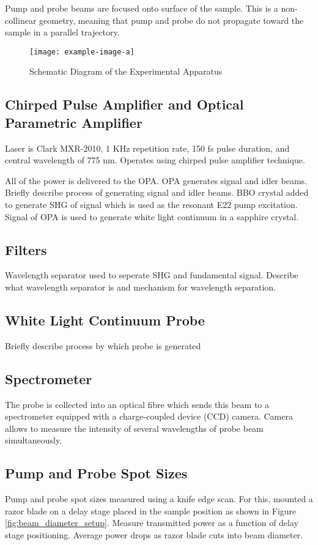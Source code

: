 Pump and probe beams are focused onto surface of the sample. This is a non-collinear geometry, meaning that pump and probe do not propagate toward the sample in a parallel trajectory. 

\begin{figure}[h]
	\centering
	\texttt{[image: example-image-a]}
	\caption{ Schematic Diagram of the Experimental Apparatus}
	\label{fig:sample_absorbance}
\end{figure}


\subsection{Chirped Pulse Amplifier and Optical Parametric Amplifier}
Laser is Clark MXR-2010, 1 KHz repetition rate, 150 fs pulse duration, and central wavelength of 775 nm. Operates using chirped pulse amplifier technique. 

All of the power is delivered to the OPA. OPA generates signal and idler beams. {\color{red} Briefly describe process of generating signal and idler beams}. BBO crystal added to generate SHG of signal which is used as the resonant E22 pump excitation. Signal of OPA is used to generate white light continuum in a sapphire crystal. 

\subsection{Filters}
 Wavelength separator used to seperate SHG and fundamental signal. {\color{red} Describe what wavelength separator is and mechanism for wavelength separation}.
 
\subsection{White Light Continuum Probe}

{\color{red} Briefly describe process by which probe is generated}

\subsection{Spectrometer}
The probe is collected into an optical fibre which sends this beam to a spectrometer equipped with a charge-coupled device (CCD) camera. Camera allows to measure the intensity of several wavelengths of probe beam simultaneously. 

\subsection{Pump and Probe Spot Sizes}
Pump and probe spot sizes measured using a knife edge scan. For this, mounted a razor blade on a delay stage placed in the sample position as shown in Figure \ref{fig:beam_diameter_setup}. Measure transmitted power as a function of delay stage positioning. Average power drops as razor blade cuts into beam diameter. 

